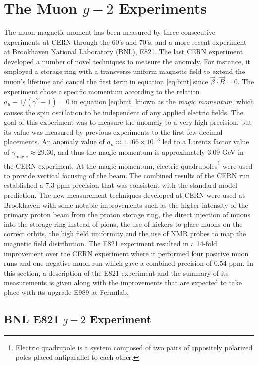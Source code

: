 \documentclass{outhesis}
\begin{document}
\section{The Muon $g-2$ Experiments}
The muon magnetic moment has been measured by three consecutive experiments at CERN through the 60's and 70's, and a more recent experiment at Brookhaven National Laboratory (BNL), E821. The last CERN experiment developed a number of novel techniques to measure the anomaly. For instance, it employed a storage ring with a transverse uniform magnetic field to extend the muon's lifetime and cancel the first term in equation \ref{eq:bmt} since $\overrightarrow{\beta} \cdot \overrightarrow{B} = 0$. The experiment chose a specific momentum according to the relation $a_{\mu} -1/\left(\gamma^2-1\right) = 0$ in equation  \ref{eq:bmt} known as the \emph{magic momentum}, which causes the spin oscillation to be independent of any applied electric fields. The goal of this experiment was to measure the anomaly to a very high precision, but its value was measured by previous experiments to the first few decimal placements. An anomaly value of $a_{\mu} \approx 1.166\times 10^{-3}$ led to a Lorentz factor value of $\gamma_{\text{magic}} \approx 29.30$, and thus the magic momentum is approximately 3.09 GeV in the CERN experiment. 
At the magic momentum, electric quadrupoles\footnote{Electric quadrupole is a system composed of two pairs of oppositely polarized poles placed antiparallel to each other.} were used to provide vertical focusing of the beam. The combined results of the CERN run established a 7.3 ppm precision that was consistent with the standard model prediction. The new measurement techniques developed at CERN were used at Brookhaven with some notable improvements such as the higher intensity of the primary proton beam from the proton storage ring, the direct injection of muons into the storage ring instead of pions, the use of kickers to place muons on the correct orbits, the  high field uniformity and the use of NMR probes to map the magnetic field distribution. The E821 experiment resulted in a 14-fold improvement over the CERN experiment where it performed four positive muon runs and one negative muon run which gave a combined precision of 0.54 ppm. In this section, a description of the E821 experiment and the summary of its measurements is given along with the improvements that are expected to take place with its upgrade E989 at Fermilab.\\

\subsection{BNL E821 $g-2$ Experiment}
\end{document}
